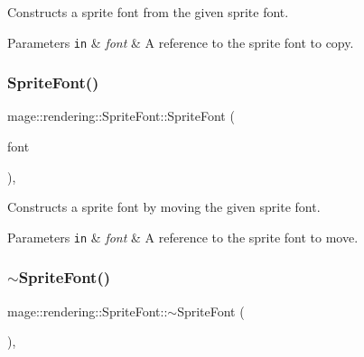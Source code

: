 Constructs a sprite font from the given sprite font.


\begin{DoxyParams}[1]{Parameters}
\mbox{\tt in}  & {\em font} & A reference to the sprite font to copy. \\
\hline
\end{DoxyParams}
\mbox{\label{classmage_1_1rendering_1_1_sprite_font_a9a2014908c6c63aa9d9ad223383bd03a}} 
\subsubsection{\texorpdfstring{Sprite\+Font()}{SpriteFont()}\hspace{0.1cm}{\footnotesize\ttfamily [3/3]}}
{\footnotesize\ttfamily mage\+::rendering\+::\+Sprite\+Font\+::\+Sprite\+Font (\begin{DoxyParamCaption}\item[{\mbox{\hyperlink{classmage_1_1rendering_1_1_sprite_font}{Sprite\+Font}} \&\&}]{font }\end{DoxyParamCaption})\hspace{0.3cm}{\ttfamily [default]}, {\ttfamily [noexcept]}}

Constructs a sprite font by moving the given sprite font.


\begin{DoxyParams}[1]{Parameters}
\mbox{\tt in}  & {\em font} & A reference to the sprite font to move. \\
\hline
\end{DoxyParams}
\mbox{\label{classmage_1_1rendering_1_1_sprite_font_a51ec0418e1456d7634c6540ccc801644}} 
\subsubsection{\texorpdfstring{$\sim$\+Sprite\+Font()}{~SpriteFont()}}
{\footnotesize\ttfamily mage\+::rendering\+::\+Sprite\+Font\+::$\sim$\+Sprite\+Font (\begin{DoxyParamCaption}{ }\end{DoxyParamCaption})\hspace{0.3cm}{\ttfamily [virtual]}, {\ttfamily [default]}}

